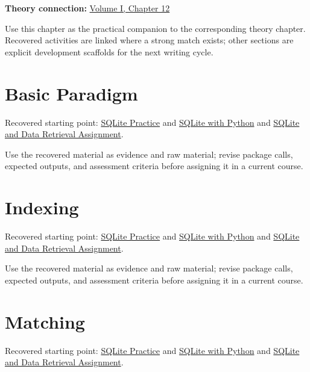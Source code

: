 \documentclass[
  letterpaper,
]{scrbook}
\begin{document}

\textbf{Theory connection:} \hyperref[ch-search]{Volume I, Chapter 12}

Use this chapter as the practical companion to the corresponding theory
chapter. Recovered activities are linked where a strong match exists;
other sections are explicit development scaffolds for the next writing
cycle.

\section*{Basic Paradigm}\label{sec-pr-12-basic-paradigm}


Recovered starting point: \hyperref[sec-lab-sqlite]{SQLite Practice} and
\hyperref[sec-lab-sqlite-python]{SQLite with Python} and
\hyperref[sec-lab-sqlite-assignment]{SQLite and Data Retrieval
Assignment}.

Use the recovered material as evidence and raw material; revise package
calls, expected outputs, and assessment criteria before assigning it in
a current course.

\section*{Indexing}\label{sec-pr-12-indexing}


Recovered starting point: \hyperref[sec-lab-sqlite]{SQLite Practice} and
\hyperref[sec-lab-sqlite-python]{SQLite with Python} and
\hyperref[sec-lab-sqlite-assignment]{SQLite and Data Retrieval
Assignment}.

Use the recovered material as evidence and raw material; revise package
calls, expected outputs, and assessment criteria before assigning it in
a current course.

\section*{Matching}\label{sec-pr-12-matching}


Recovered starting point: \hyperref[sec-lab-sqlite]{SQLite Practice} and
\hyperref[sec-lab-sqlite-python]{SQLite with Python} and
\hyperref[sec-lab-sqlite-assignment]{SQLite and Data Retrieval
Assignment}.
\end{document}
